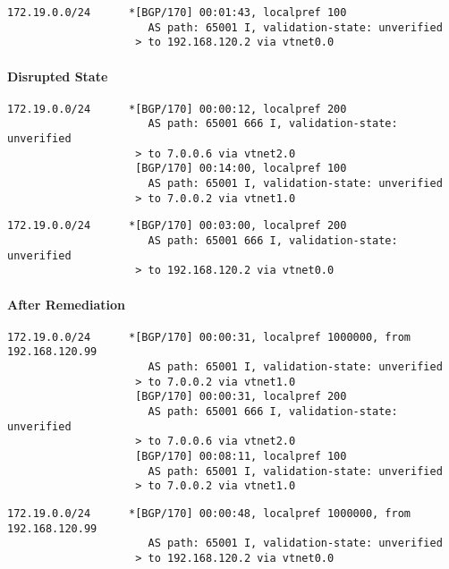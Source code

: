 \begin{lstlisting}[title=As seen at ASBR2]
172.19.0.0/24      *[BGP/170] 00:01:43, localpref 100
                      AS path: 65001 I, validation-state: unverified
                    > to 192.168.120.2 via vtnet0.0
\end{lstlisting}

\paragraph{Disrupted State}
\begin{lstlisting}[title=As seen at ASBR1]
172.19.0.0/24      *[BGP/170] 00:00:12, localpref 200
                      AS path: 65001 666 I, validation-state: unverified
                    > to 7.0.0.6 via vtnet2.0
                    [BGP/170] 00:14:00, localpref 100
                      AS path: 65001 I, validation-state: unverified
                    > to 7.0.0.2 via vtnet1.0
\end{lstlisting}

\begin{lstlisting}[title=As seen at ASBR2]
172.19.0.0/24      *[BGP/170] 00:03:00, localpref 200
                      AS path: 65001 666 I, validation-state: unverified
                    > to 192.168.120.2 via vtnet0.0
\end{lstlisting}

\paragraph{After Remediation}
\begin{lstlisting}[title=As seen at ASBR1]
172.19.0.0/24      *[BGP/170] 00:00:31, localpref 1000000, from 192.168.120.99
                      AS path: 65001 I, validation-state: unverified
                    > to 7.0.0.2 via vtnet1.0
                    [BGP/170] 00:00:31, localpref 200
                      AS path: 65001 666 I, validation-state: unverified
                    > to 7.0.0.6 via vtnet2.0
                    [BGP/170] 00:08:11, localpref 100
                      AS path: 65001 I, validation-state: unverified
                    > to 7.0.0.2 via vtnet1.0
\end{lstlisting}

\begin{lstlisting}[title=As seen at ASBR2]
172.19.0.0/24      *[BGP/170] 00:00:48, localpref 1000000, from 192.168.120.99
                      AS path: 65001 I, validation-state: unverified
                    > to 192.168.120.2 via vtnet0.0
\end{lstlisting}


